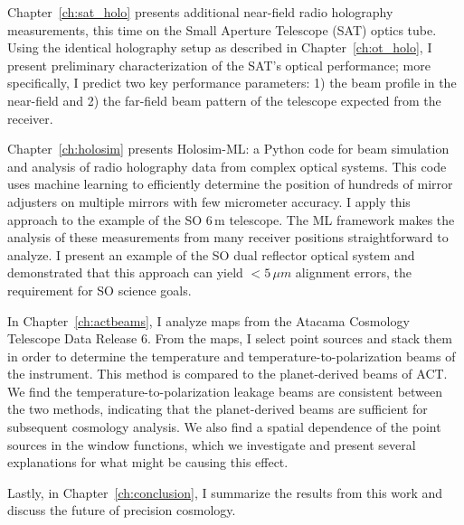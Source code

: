 Chapter~\ref{ch:sat_holo} presents additional near-field radio holography measurements, this time on the Small Aperture Telescope (SAT) optics tube.  Using the identical holography setup as described in Chapter~\ref{ch:ot_holo}, I present preliminary characterization of the SAT's optical performance; more specifically, I predict two key performance parameters: 1) the beam profile in the near-field and 2) the far-field beam pattern of the telescope expected from the receiver.

Chapter~\ref{ch:holosim} presents Holosim-ML: a Python code for beam simulation and analysis of radio holography data from complex optical systems.  This code uses machine learning to efficiently determine the position of hundreds of mirror adjusters on multiple mirrors with few micrometer accuracy.  I apply this approach to the example of the SO 6\,m telescope.  The ML framework makes the analysis of these measurements from many receiver positions straightforward to analyze.  I present an example of the SO dual reflector optical system and demonstrated that this approach can yield $<5\,\mu m$ alignment errors, the requirement for SO science goals.

In Chapter~\ref{ch:actbeams}, I analyze maps from the Atacama Cosmology Telescope Data Release 6.  From the maps, I select point sources and stack them in order to determine the temperature and temperature-to-polarization beams of the instrument.  This method is compared to the planet-derived beams of ACT.  We find the temperature-to-polarization leakage beams are consistent between the two methods, indicating that the planet-derived beams are sufficient for subsequent cosmology analysis.  We also find a spatial dependence of the point sources in the window functions, which we investigate and present several explanations for what might be causing this effect.

Lastly, in Chapter~\ref{ch:conclusion}, I summarize the results from this work and discuss the future of precision cosmology.